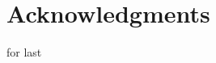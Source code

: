 \documentclass[a4paper,11pt,twoside]{ThesisStyle}
\begin{document}
\cleardoublepage

\section*{Acknowledgments}

for last


\tableofcontents
\newpage
\listoffigures
\newpage
\listoftables

\mainmatter

















\end{document}
